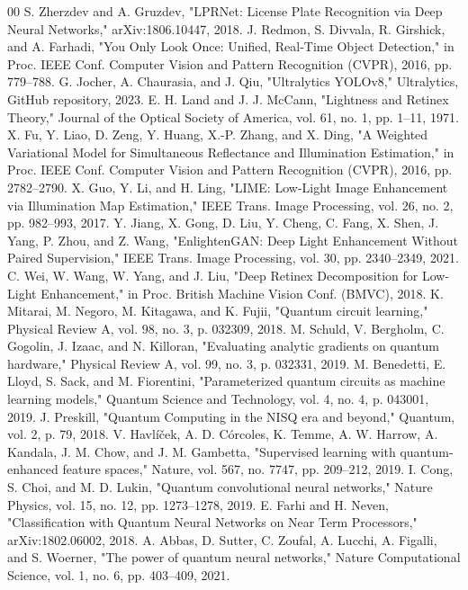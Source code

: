 \documentclass[preprint,12pt]{elsarticle}
\begin{document}
\begin{thebibliography}{00}
 S. Zherzdev and A. Gruzdev, "LPRNet: License Plate Recognition via Deep Neural Networks," arXiv:1806.10447, 2018.
 J. Redmon, S. Divvala, R. Girshick, and A. Farhadi, "You Only Look Once: Unified, Real-Time Object Detection," in Proc. IEEE Conf. Computer Vision and Pattern Recognition (CVPR), 2016, pp. 779--788.
 G. Jocher, A. Chaurasia, and J. Qiu, "Ultralytics YOLOv8," Ultralytics, GitHub repository, 2023.
 E. H. Land and J. J. McCann, "Lightness and Retinex Theory," Journal of the Optical Society of America, vol. 61, no. 1, pp. 1--11, 1971.
 X. Fu, Y. Liao, D. Zeng, Y. Huang, X.-P. Zhang, and X. Ding, "A Weighted Variational Model for Simultaneous Reflectance and Illumination Estimation," in Proc. IEEE Conf. Computer Vision and Pattern Recognition (CVPR), 2016, pp. 2782--2790.
 X. Guo, Y. Li, and H. Ling, "LIME: Low-Light Image Enhancement via Illumination Map Estimation," IEEE Trans. Image Processing, vol. 26, no. 2, pp. 982--993, 2017.
 Y. Jiang, X. Gong, D. Liu, Y. Cheng, C. Fang, X. Shen, J. Yang, P. Zhou, and Z. Wang, "EnlightenGAN: Deep Light Enhancement Without Paired Supervision," IEEE Trans. Image Processing, vol. 30, pp. 2340--2349, 2021.
 C. Wei, W. Wang, W. Yang, and J. Liu, "Deep Retinex Decomposition for Low-Light Enhancement," in Proc. British Machine Vision Conf. (BMVC), 2018.
 K. Mitarai, M. Negoro, M. Kitagawa, and K. Fujii, "Quantum circuit learning," Physical Review A, vol. 98, no. 3, p. 032309, 2018.
 M. Schuld, V. Bergholm, C. Gogolin, J. Izaac, and N. Killoran, "Evaluating analytic gradients on quantum hardware," Physical Review A, vol. 99, no. 3, p. 032331, 2019.
 M. Benedetti, E. Lloyd, S. Sack, and M. Fiorentini, "Parameterized quantum circuits as machine learning models," Quantum Science and Technology, vol. 4, no. 4, p. 043001, 2019.
 J. Preskill, "Quantum Computing in the NISQ era and beyond," Quantum, vol. 2, p. 79, 2018.
 V. Havlíček, A. D. Córcoles, K. Temme, A. W. Harrow, A. Kandala, J. M. Chow, and J. M. Gambetta, "Supervised learning with quantum-enhanced feature spaces," Nature, vol. 567, no. 7747, pp. 209--212, 2019.
 I. Cong, S. Choi, and M. D. Lukin, "Quantum convolutional neural networks," Nature Physics, vol. 15, no. 12, pp. 1273--1278, 2019.
 E. Farhi and H. Neven, "Classification with Quantum Neural Networks on Near Term Processors," arXiv:1802.06002, 2018.
 A. Abbas, D. Sutter, C. Zoufal, A. Lucchi, A. Figalli, and S. Woerner, "The power of quantum neural networks," Nature Computational Science, vol. 1, no. 6, pp. 403--409, 2021.

\end{thebibliography}
\end{document}
